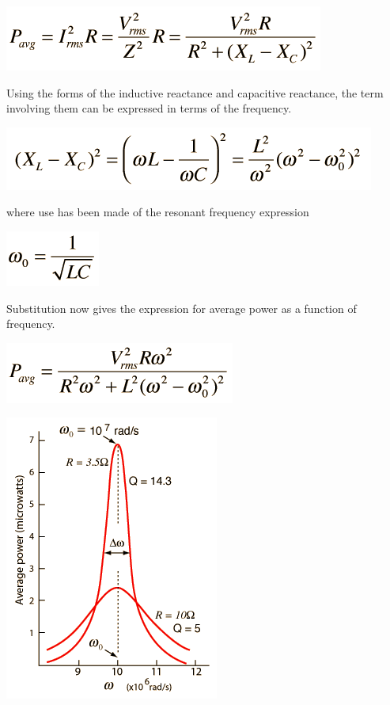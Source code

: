 \includegraphics{./resonant-rlc-circuits_files/pser.png}

Using the forms of the inductive reactance and capacitive reactance, the
term involving them can be expressed in terms of the frequency.

\includegraphics{./resonant-rlc-circuits_files/pser2.png}

where use has been made of the resonant frequency expression

\includegraphics{./resonant-rlc-circuits_files/pser3.png}

Substitution now gives the expression for average power as a function of
frequency.

\includegraphics{./resonant-rlc-circuits_files/pser4.png}

\includegraphics{./resonant-rlc-circuits_files/qpow.png}\strut


